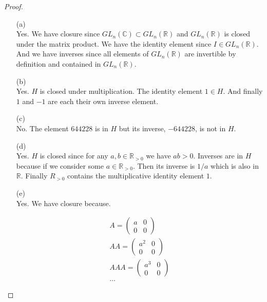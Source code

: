 \documentclass[12pt,leqno]{article}
\numberwithin{equation}{section}
\theoremstyle{definition}
\begin{document}
\begin{proof}[Proof]
    \hfill  \\
\begin{enumerate}
\item[(a)] \hfill \\

    Yes. We have closure since $GL_n (\mathbb C) \subset GL_n (\mathbb R)$ and
    $GL_n (\mathbb R)$ is closed under the matrix product. We have the identity
    element since $I \in GL_n (\mathbb R)$. And we have inverses since all
    elements of $GL_n (\mathbb R)$ are invertible by definition and contained
    in $GL_n (\mathbb R)$.

\item[(b)] \hfill \\

    Yes. $H$ is closed under multiplication. The identity element $1 \in H$.
    And finally $1$ and $-1$ are each their own inverse element.

\item[(c)] \hfill \\

    No. The element $644228$ is in $H$ but its inverse, $-644228$, is not in $H$.

\item[(d)] \hfill \\

    Yes. $H$ is closed since for any $a, b \in \mathbb R_{> 0}$ we have $ab >
    0$.  Inverses are in $H$ because if we consider some $a \in \mathbb
    R_{>0}$. Then its inverse is $1/a$ which is also in $\mathbb R$. Finally
    $R_{>0}$ contains the multiplicative identity element $1$.

\item[(e)] \hfill \\

    Yes. We have closure because.

    \begin{align*}
        A = \left ( 
        \begin{array}{cc}
            a & 0 \\
            0 & 0
        \end{array} \right )    \\
        A A = \left ( 
        \begin{array}{cc}
            a^2 & 0 \\
            0 & 0
        \end{array} \right )    \\
        AAA = \left ( 
        \begin{array}{cc}
            a^3 & 0 \\
            0 & 0
        \end{array} \right )    \\
        \dots
    \end{align*}


\end{enumerate}
\end{proof}
\end{document}
